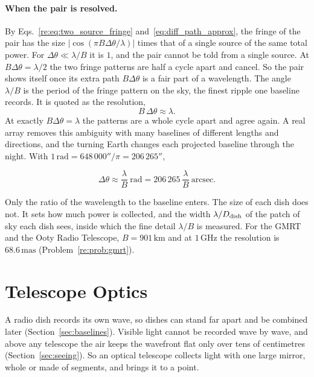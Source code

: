 \paragraph{When the pair is resolved.} By Eqs.~\eqref{re:eq:two_source_fringe} and~\eqref{eq:diff_path_approx}, the fringe of the pair has the size $|\cos(\pi B\Delta\theta/\lambda)|$ times that of a single source of the same total power. For $\Delta\theta\ll\lambda/B$ it is $1$, and the pair cannot be told from a single source. At $B\Delta\theta=\lambda/2$ the two fringe patterns are half a cycle apart and cancel. So the pair shows itself once its extra path $B\Delta\theta$ is a fair part of a wavelength. The angle $\lambda/B$ is the period of the fringe pattern on the sky, the finest ripple one baseline records. It is quoted as the resolution,
\begin{equation}
	B\,\Delta\theta \approx \lambda .
	\label{eq:interferometer_resolution_condition}
\end{equation}
At exactly $B\Delta\theta=\lambda$ the patterns are a whole cycle apart and agree again. A real array removes this ambiguity with many baselines of different lengths and directions, and the turning Earth changes each projected baseline through the night. With $1\,\mathrm{rad}=648\,000''/\pi=206\,265''$,
\begin{keyresult}
	\begin{equation}
		\Delta\theta \approx \frac{\lambda}{B}\ \text{rad} = 206\,265\,\frac{\lambda}{B}\ \text{arcsec}.
		\label{eq:interferometric_resolution_formula}
	\end{equation}
\end{keyresult}
Only the ratio of the wavelength to the baseline enters. The size of each dish does not. It sets how much power is collected, and the width $\lambda/D_{\rm dish}$ of the patch of sky each dish sees, inside which the fine detail $\lambda/B$ is measured. For the GMRT and the Ooty Radio Telescope, $B=901\,\mathrm{km}$ and at $1\,\mathrm{GHz}$ the resolution is $68.6\,\mathrm{mas}$ (Problem~\ref{re:prob:gmrt}).

\section{Telescope Optics}
\label{sec:optics}

A radio dish records its own wave, so dishes can stand far apart and be combined later (Section~\ref{sec:baselines}). Visible light cannot be recorded wave by wave, and above any telescope the air keeps the wavefront flat only over tens of centimetres (Section~\ref{sec:seeing}). So an optical telescope collects light with one large mirror, whole or made of segments, and brings it to a point.

